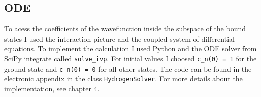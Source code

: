 






\subsection{ODE}
To acess the coefficients of the wavefunction inside the subspace of the bound states I used the interaction picture and the coupled system of differential equations. 
To implement the calculation I used Python and the ODE solver from SciPy integrate called \texttt{solve\_ivp}.
For initial values I choosed \texttt{c\_n(0) = 1} for the ground state and \texttt{c\_n(0) = 0} for all other states.
The code can be found in the electronic appendix in the class \texttt{HydrogenSolver}.
For more details about the implementation, see chapter 4.





